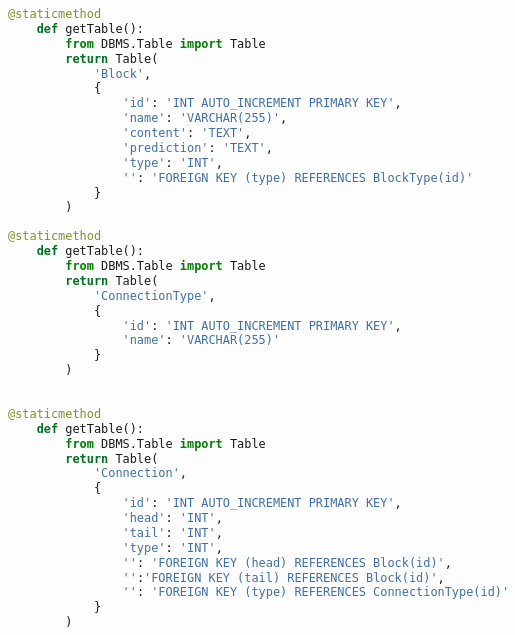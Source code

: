 \begin{lstlisting}[language=Python, caption={$\texttt{getTable}$ function - Block class.}, label={lst:18}]
    @staticmethod
    def getTable():
        from DBMS.Table import Table
        return Table(
            'Block',
            {
                'id': 'INT AUTO_INCREMENT PRIMARY KEY',
                'name': 'VARCHAR(255)',
                'content': 'TEXT',
                'prediction': 'TEXT',
                'type': 'INT',
                '': 'FOREIGN KEY (type) REFERENCES BlockType(id)'
            }
        )
\end{lstlisting}

\begin{lstlisting}[language=Python, caption={$\texttt{getTable}$ function - ConnectionType class.}, label={lst:19}]
    @staticmethod
    def getTable():
        from DBMS.Table import Table
        return Table(
            'ConnectionType',
            {
                'id': 'INT AUTO_INCREMENT PRIMARY KEY',
                'name': 'VARCHAR(255)'
            }
        )
    
\end{lstlisting}

\begin{lstlisting}[language=Python, caption={$\texttt{getTable}$ function - Connection class.}, label={lst:20}]
    @staticmethod
    def getTable():
        from DBMS.Table import Table
        return Table(
            'Connection',
            {
                'id': 'INT AUTO_INCREMENT PRIMARY KEY',
                'head': 'INT',
                'tail': 'INT',
                'type': 'INT',
                '': 'FOREIGN KEY (head) REFERENCES Block(id)',
                '':'FOREIGN KEY (tail) REFERENCES Block(id)',
                '': 'FOREIGN KEY (type) REFERENCES ConnectionType(id)'
            }
        )
\end{lstlisting}

